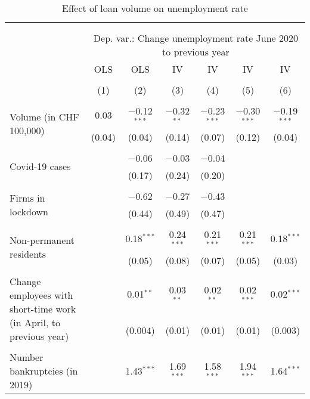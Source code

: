 
\begin{table}[!htbp] \centering 
  \caption{Effect of loan volume on unemployment rate} 
  \label{tab:Results} 
\footnotesize 
\begin{tabular}{@{\extracolsep{5pt}}lcccccc} 
\\[-1.8ex]\hline 
\hline \\[-1.8ex] 
\\[-1.8ex] & \multicolumn{6}{c}{Dep. var.: Change unemployment rate June 2020 to previous year} \\ 
 & OLS & OLS & IV & IV & IV & IV \\ 
\\[-1.8ex] & (1) & (2) & (3) & (4) & (5) & (6)\\ 
\hline \\[-1.8ex] 
 \multirow{2}{4.5cm}{Volume (in CHF 100,000)} & 0.03 & $-$0.12$^{***}$ & $-$0.32$^{**}$ & $-$0.23$^{***}$ & $-$0.30$^{***}$ & $-$0.19$^{***}$ \\ 
  & (0.04) & (0.04) & (0.14) & (0.07) & (0.12) & (0.04) \\ 
  & & & & & & \\ 
 \multirow{2}{4.5cm}{Covid-19 cases} &  & $-$0.06 & $-$0.03 & $-$0.04 &  &  \\ 
  &  & (0.17) & (0.24) & (0.20) &  &  \\ 
  & & & & & & \\ 
 \multirow{2}{4.5cm}{Firms in lockdown} &  & $-$0.62 & $-$0.27 & $-$0.43 &  &  \\ 
  &  & (0.44) & (0.49) & (0.47) &  &  \\ 
  & & & & & & \\ 
 \multirow{2}{4.5cm}{Non-permanent residents} &  & 0.18$^{***}$ & 0.24$^{***}$ & 0.21$^{***}$ & 0.21$^{***}$ & 0.18$^{***}$ \\ 
  &  & (0.05) & (0.08) & (0.07) & (0.05) & (0.03) \\ 
  & & & & & & \\ 
 \multirow{2}{4.5cm}{Change employees with short-time work (in April, to previous year)} &  & 0.01$^{**}$ & 0.03$^{**}$ & 0.02$^{**}$ & 0.02$^{***}$ & 0.02$^{***}$ \\ 
  &  & (0.004) & (0.01) & (0.01) & (0.01) & (0.003) \\ 
  & & & & & & \\ 
 \multirow{2}{4.5cm}{Number bankruptcies (in 2019)} &  & 1.43$^{***}$ & 1.69$^{***}$ & 1.58$^{***}$ & 1.94$^{***}$ & 1.64$^{***}$ \\ 

\end{tabular}
\end{table}
